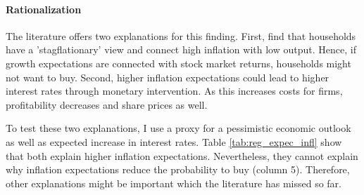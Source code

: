 \documentclass[ProjectABM]{subfiles}
\begin{document}








\paragraph{Rationalization}
The literature offers two explanations for this finding. First, \cite{CCG_2020_inflation_communication} find that households have a 'stagflationary' view and connect high inflation with low output. Hence, if growth expectations are connected with stock market returns, households might not want to buy. Second, higher inflation expectations could lead to higher interest rates through monetary intervention. As this increases costs for firms, profitability decreases and share prices as well. 

To test these two explanations, I use a proxy for a pessimistic economic outlook as well as expected increase in interest rates. Table \ref{tab:reg_expec_infl} show that both explain higher inflation expectations. Nevertheless, they cannot explain why inflation expectations reduce the probability to buy (column 5). Therefore, other explanations might be important which the literature has missed so far.



\end{document}

